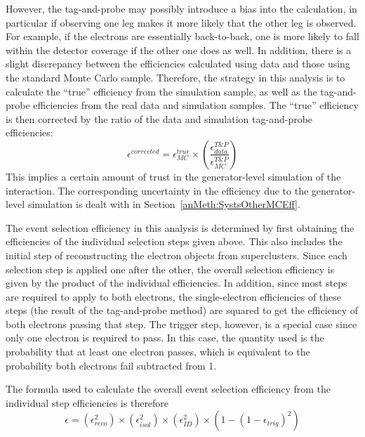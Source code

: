 However, the tag-and-probe may possibly introduce a bias 
into the calculation, 
in particular if observing one leg makes it more likely that 
the other leg is observed. 
For example, if the electrons are essentially back-to-back, 
one is more likely to fall within the detector coverage 
if the other one does as well.  
In addition, there is a slight discrepancy between the efficiencies 
calculated using data and those using the standard Monte Carlo sample.  
Therefore, the strategy in this analysis is to calculate the 
``true'' efficiency from the simulation sample, 
as well as the tag-and-probe efficiencies from the real data 
and simulation samples.  
The ``true'' efficiency is then corrected by the ratio of the 
data and simulation tag-and-probe efficiencies:
\[
\epsilon^{corrected} = \epsilon_{MC}^{true} \times \left( \frac{\epsilon_{data}^{T\&P}}{\epsilon_{MC}^{T\&P}} \right)
\]
This implies a certain amount of trust in the generator-level simulation of the interaction.  
The corresponding uncertainty in the efficiency due to the generator-level simulation 
is dealt with in 
Section~\ref{anMeth:SystsOtherMCEff}.  

The event selection efficiency in this analysis is determined 
by first obtaining the efficiencies of the individual 
selection steps given above. %
This also includes the initial step of reconstructing 
the electron objects from superclusters.  
Since each selection step is applied one after the other, 
the overall selection efficiency is given by the product 
of the individual efficiencies.  
In addition, since most steps are required to apply to both electrons, 
the single-electron efficiencies of these steps 
(the result of the tag-and-probe method)
are squared to get 
the efficiency of both electrons passing that step.  
The trigger step, however, is a special case since only one electron is 
required to pass.  
In this case, the quantity used is the probability that at least 
one electron passes, 
which is equivalent to the probability both electrons fail 
subtracted from 1.  


The formula used to calculate the overall event selection efficiency 
from the individual step efficiencies is therefore 
\[
\epsilon = \left(\epsilon_{reco}^2\right) 
\times \left(\epsilon_{isol}^2\right) 
\times \left(\epsilon_{ID}^2\right) 
\times \left( 1 - \left( 1 - \epsilon_{trig} \right)^2 \right)
\]

